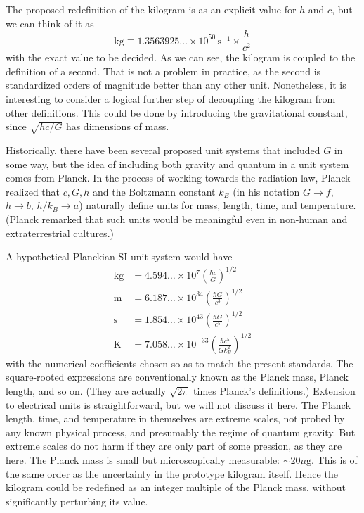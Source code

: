 \documentclass[prb,preprint]{revtex4-1}
\begin{document}
The proposed redefinition of the kilogram is as an explicit value for
$h$ and $c$, but we can think of it as
\begin{equation}
\mathrm{kg} \equiv 1.3563925\ldots \times 10^{50} \, \mathrm{s}^{-1}
                   \times \frac{h}{c^2}
\end{equation}
with the exact value to be decided.  As we can see, the kilogram is
coupled to the definition of a second.  That is not a problem in
practice, as the second is standardized orders of magnitude better
than any other unit.  Nonetheless, it is interesting to consider a
logical further step of decoupling the kilogram from other
definitions.  This could be done by introducing the gravitational
constant, since $\sqrt{hc/G}$ has dimensions of mass.

Historically, there have been several proposed unit systems that
included $G$ in some way,\cite{Tomilin1999} but the idea of including
both gravity and quantum in a unit system comes from
Planck\cite{Planck99}.  In the process of working towards the
radiation law, Planck realized that $c,G,h$ and the Boltzmann constant
$k_B$ (in his notation $G\rightarrow f$, $h\rightarrow b$,
$h/k_B\rightarrow a$) naturally define units for mass, length, time,
and temperature.  (Planck remarked that such units would be meaningful
even in non-human and extraterrestrial cultures.)

A hypothetical Planckian SI unit system would have
\begin{equation} \label{eq:defs}
\begin{aligned}
\mathrm{kg} &= 4.594\ldots \times 10^7
               \left(\frac{\hbar c}{G}\right)^{\!1/2} \\
\mathrm{m}  &= 6.187\ldots \times 10^{34}
               \left(\frac{\hbar G}{c^3}\right)^{\!1/2} \\
\mathrm{s}  &= 1.854\ldots \times 10^{43}
               \left(\frac{\hbar G}{c^5}\right)^{\!1/2} \\
\mathrm{K}  &= 7.058\ldots \times 10^{-33}
               \left(\frac{\hbar c^5}{Gk_B^2}\right)^{\!1/2}
\end{aligned}
\end{equation}
with the numerical coefficients chosen so as to match the present
standards.  The square-rooted expressions are conventionally known as
the Planck mass, Planck length, and so on.  (They are actually
$\sqrt{2\pi}$ times Planck's definitions.)  Extension to electrical
units is straightforward, but we will not discuss it here.  The Planck
length, time, and temperature in themselves are extreme scales, not
probed by any known physical process, and presumably the regime of
quantum gravity.  But extreme scales do not harm if they are only part
of some pression, as they are here.  The Planck mass is small but
microscopically measurable: $\sim20\mu\mathrm{g}$.  This is of the
same order as the uncertainty in the prototype kilogram itself.  Hence
the kilogram could be redefined as an integer multiple of the Planck
mass, without significantly perturbing its value.
\end{document}
